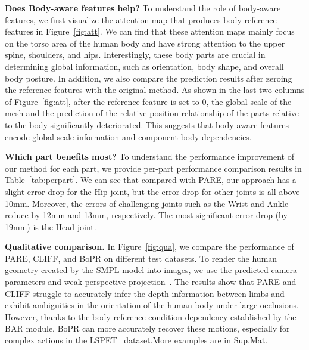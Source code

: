 \documentclass[10pt,twocolumn,letterpaper]{article}
\begin{document}
\noindent\textbf{Does Body-aware features help?}
To understand the role of body-aware features, we first visualize the attention map that produces body-reference features in Figure~\ref{fig:att}. We can find that these attention maps mainly focus on the torso area of the human body and have strong attention to the upper spine, shoulders, and hips. Interestingly, these body parts are crucial in determining global information, such as orientation, body shape, and overall body posture. In addition, we also compare the prediction results after zeroing the reference features with the original method. As shown in the last two columns of Figure~\ref{fig:att}, after the reference feature is set to 0, the global scale of the mesh and the prediction of the relative position relationship of the parts relative to the body significantly deteriorated. This suggests that body-aware features encode global scale information and component-body dependencies.

\noindent\textbf{Which part benefits most?} To understand the performance improvement of our method for each part, we provide per-part performance comparison results in Table~\ref{tab:perpart}. We can see that compared with PARE, our approach has a slight error drop for the Hip joint, but the error drop for other joints is all above 10mm. Moreover, the errors of challenging joints such as the Wrist and Ankle reduce by 12mm and 13mm, respectively. The most significant error drop (by 19mm)  is the Head joint.








\noindent\textbf{Qualitative comparison.}
In Figure~\ref{fig:qua}, we compare the performance of PARE, CLIFF, and BoPR on different test datasets. To render the human geometry created by the SMPL model into images, we use the predicted camera parameters and weak perspective projection~\cite{kissos2020beyond}. The results show that PARE and CLIFF struggle to accurately infer the depth information between limbs and exhibit ambiguities in the orientation of the human body under large occlusions. However, thanks to the body reference condition dependency established by the BAR module, BoPR can more accurately recover these motions, especially for complex actions in the LSPET~\cite{johnson2011learning} dataset.More examples are in Sup.Mat.
\end{document}
